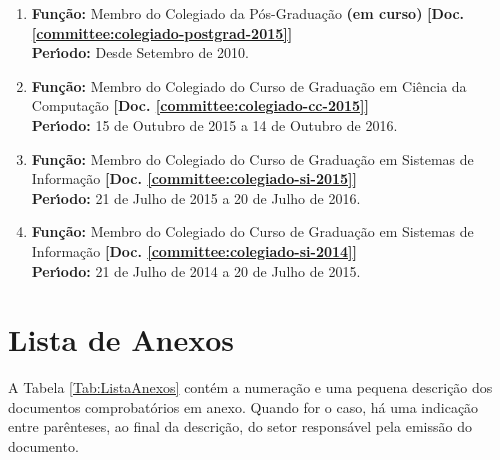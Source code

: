 \documentclass[a4paper,oneside,10pt]{article}
\newcounter{document}%
\begin{document}
\begin{enumerate}
\renewcommand{\labelenumi}{{\large\bfseries\arabic{enumi}.}}

\item   \textbf{Fun\c{c}\~{a}o:} Membro do Colegiado da P\'{o}s-Gradua\c{c}\~{a}o \textbf{(em curso)}  \textbf{[Doc. \ref{committee:colegiado-postgrad-2015}]} \\
        \textbf{Per\'{\i}odo:} Desde Setembro de 2010.

\item   \textbf{Fun\c{c}\~{a}o:} Membro do Colegiado do Curso de Graduação em Ciência da Computação \textbf{[Doc. \ref{committee:colegiado-cc-2015}]} \\
        \textbf{Per\'{\i}odo:} 15 de Outubro de 2015 a 14 de Outubro de 2016.

\item   \textbf{Fun\c{c}\~{a}o:} Membro do Colegiado do Curso de Graduação em Sistemas de Informação \textbf{[Doc. \ref{committee:colegiado-si-2015}]} \\
        \textbf{Per\'{\i}odo:} 21 de Julho de 2015 a 20 de Julho de 2016.

\item   \textbf{Fun\c{c}\~{a}o:} Membro do Colegiado do Curso de Graduação em Sistemas de Informação \textbf{[Doc. \ref{committee:colegiado-si-2014}]} \\
        \textbf{Per\'{\i}odo:} 21 de Julho de 2014 a 20 de Julho de 2015.

\end{enumerate}


\newpage
\section{Lista de Anexos}

A Tabela \ref{Tab:ListaAnexos} cont\'{e}m a numera\c{c}\~{a}o e uma pequena descri\c{c}\~{a}o dos documentos comprobat\'{o}rios em anexo. Quando for o caso, h\'{a} uma indica\c{c}\~{a}o entre par\^{e}nteses, ao final da descri\c{c}\~{a}o, do setor respons\'{a}vel pela emiss\~{a}o do documento.
\end{document}
